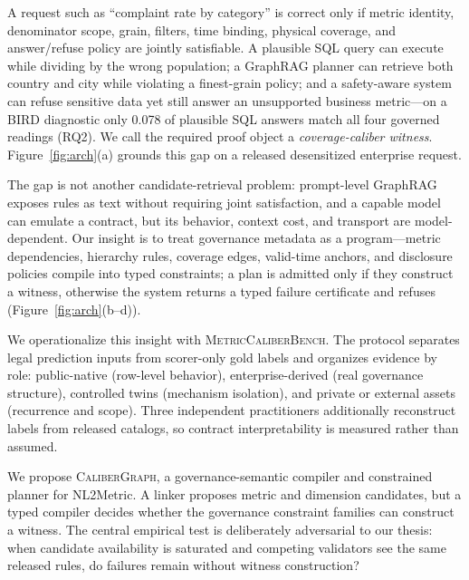 \documentclass[letterpaper]{article}
\begin{document}
A request such as ``complaint rate by category'' is correct only if metric identity, denominator scope, grain, filters, time binding, physical coverage, and answer/refuse policy are jointly satisfiable. A plausible SQL query can execute while dividing by the wrong population; a GraphRAG planner can retrieve both country and city while violating a finest-grain policy; and a safety-aware system can refuse sensitive data yet still answer an unsupported business metric---on a BIRD diagnostic only 0.078 of plausible SQL answers match all four governed readings (RQ2). We call the required proof object a \emph{coverage-caliber witness}. Figure~\ref{fig:arch}(a) grounds this gap on a released desensitized enterprise request.

The gap is not another candidate-retrieval problem: prompt-level GraphRAG exposes rules as text without requiring joint satisfaction, and a capable model can emulate a contract, but its behavior, context cost, and transport are model-dependent. Our insight is to treat governance metadata as a program---metric dependencies, hierarchy rules, coverage edges, valid-time anchors, and disclosure policies compile into typed constraints; a plan is admitted only if they construct a witness, otherwise the system returns a typed failure certificate and refuses (Figure~\ref{fig:arch}(b--d)).

We operationalize this insight with \textsc{MetricCaliberBench}. The protocol separates legal prediction inputs from scorer-only gold labels and organizes evidence by role: public-native (row-level behavior), enterprise-derived (real governance structure), controlled twins (mechanism isolation), and private or external assets (recurrence and scope). Three independent practitioners additionally reconstruct labels from released catalogs, so contract interpretability is measured rather than assumed.

We propose \textsc{CaliberGraph}, a governance-semantic compiler and constrained planner for NL2Metric. A linker proposes metric and dimension candidates, but a typed compiler decides whether the governance constraint families can construct a witness. The central empirical test is deliberately adversarial to our thesis: when candidate availability is saturated and competing validators see the same released rules, do failures remain without witness construction?
\end{document}
